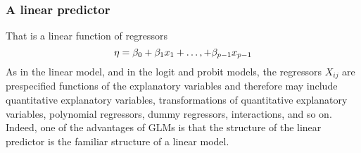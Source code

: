 \subsubsection*{A linear predictor}That is a linear function of regressors
\begin{equation}
	\centering
	\eta = \beta_0 + \beta_1 x_1 + \ldots, + \beta_{p-1}x_{p-1} 
\end{equation}
As in the linear model, and in the logit and probit models, the regressors $X_{ij}$ are prespecified functions of the explanatory variables and therefore may include quantitative explanatory variables, transformations of quantitative explanatory variables, polynomial regressors, dummy regressors, interactions, and so on. Indeed, one of the advantages of GLMs is that the structure of the linear predictor is the familiar structure of a linear model.
